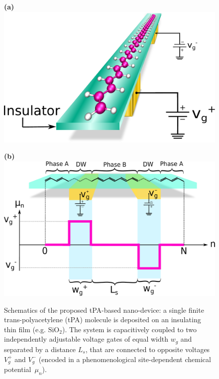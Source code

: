 \documentclass[10pt,a4paper]{article}
\begin{document}
\begin{figure}
    \centering
    \begin{minipage}[t]{0.35\textwidth}
        \raggedright
        \textbf{(a) } \vspace{1.5cm} \\
        \includegraphics[width=\textwidth]{figures/device.pdf}
    \end{minipage}
    \hfill
    \begin{minipage}[t]{0.6\textwidth}
        \raggedright
        \textbf{(b)} \\
        \includegraphics[width=\textwidth]{figures/diagram.pdf}
    \end{minipage}
    \caption{Schematics of the proposed tPA-based nano-device: a single finite trans-polyacetylene (tPA) molecule is deposited on an insulating thin film (e.g. $\text{SiO}_2$). The system is capacitively coupled to two independently adjustable voltage gates of equal width $w_{g}$ and separated by a distance $L_{s}$, that are connected to opposite voltages $V_{g}^{+}$ and $V_{g}^{-}$ (encoded in a phenomenological site-dependent chemical potential~$\mu_{n}$).}\label{fig:device}
\end{figure}
\end{document}
